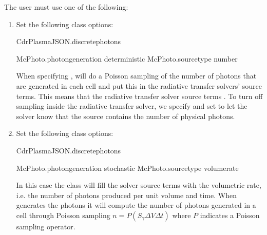 \documentclass[letterpaper,10pt,english]{sphinxmanual}
\begin{document}
The user must use one of the following:
\begin{enumerate}
%
\item {} 
Set the following class options:

\begin{sphinxVerbatim}[commandchars=\\\{\},formatcom=\scriptsize]
CdrPlasmaJSON.discrete\PYGZus{}photons  

McPhoto.photon\PYGZus{}generation  deterministic
McPhoto.source\PYGZus{}type        number
\end{sphinxVerbatim}

When specifying ,  will do a Poisson sampling of the number of photons that are generated in each cell and put this in the radiative transfer solvers’ source terms.
This means that the radiative transfer solver source terms .
To turn off sampling inside the radiative transfer solver, we specify  and set  to let the solver know that the source contains the number of physical photons.

\item {} 
Set the following class options:

\begin{sphinxVerbatim}[commandchars=\\\{\},formatcom=\scriptsize]
CdrPlasmaJSON.discrete\PYGZus{}photons  

McPhoto.photon\PYGZus{}generation  stochastic
McPhoto.source\PYGZus{}type        volume\PYGZus{}rate
\end{sphinxVerbatim}

In this case the  class will fill the solver source terms with the volumetric rate, i.e. the number of photons produced per unit volume and time.
When  generates the photons it will compute the number of photons generated in a cell through Poisson sampling \(n = P\left(S_\gamma\Delta V\Delta t\right)\) where \(P\) indicates a Poisson sampling operator.

\end{enumerate}
\end{document}
